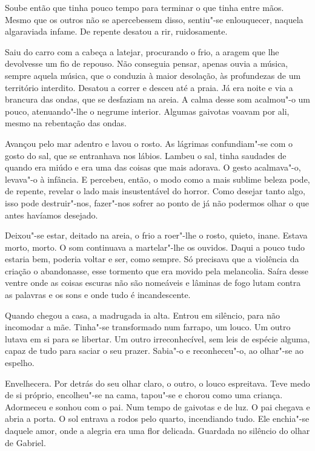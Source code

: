 Soube então que tinha pouco tempo para terminar o que tinha entre mãos.
Mesmo que os outros não se apercebessem disso, sentiu"-se enlouquecer,
naquela algaraviada infame. De repente desatou a rir, ruidosamente.

Saiu do carro com a cabeça a latejar, procurando o frio, a aragem que
lhe devolvesse um fio de repouso. Não conseguia pensar, apenas ouvia a
música, sempre aquela música, que o conduzia à maior desolação, às
profundezas de um território interdito. Desatou a correr e desceu até a
praia. Já era noite e via a brancura das ondas, que se desfaziam na
areia. A calma desse som acalmou"-o um pouco, atenuando"-lhe o negrume
interior. Algumas gaivotas voavam por ali, mesmo na rebentação das
ondas.

Avançou pelo mar adentro e lavou o rosto. As lágrimas confundiam"-se com
o gosto do sal, que se entranhava nos lábios. Lambeu o sal, tinha
saudades de quando era miúdo e era uma das coisas que mais adorava. O
gesto acalmava"-o, levava"-o à infância. E percebeu, então, o modo como a
mais sublime beleza pode, de repente, revelar o lado mais insustentável
do horror. Como desejar tanto algo, isso pode destruir"-nos, fazer"-nos
sofrer ao ponto de já não podermos olhar o que antes havíamos desejado.

Deixou"-se estar, deitado na areia, o frio a roer"-lhe o rosto, quieto,
inane. Estava morto, morto. O som continuava a martelar"-lhe os ouvidos.
Daqui a pouco tudo estaria bem, poderia voltar e ser, como sempre. Só
precisava que a violência da criação o abandonasse, esse tormento que
era movido pela melancolia. Saíra desse ventre onde as coisas escuras
não são nomeáveis e lâminas de fogo lutam contra as palavras e os sons e
onde tudo é incandescente.

Quando chegou a casa, a madrugada ia alta. Entrou em silêncio, para não
incomodar a mãe. Tinha"-se transformado num farrapo, um louco. Um outro
lutava em si para se libertar. Um outro irreconhecível, sem leis de
espécie alguma, capaz de tudo para saciar o seu prazer. Sabia"-o e
reconheceu"-o, ao olhar"-se ao espelho.

Envelhecera. Por detrás do seu olhar claro, o outro, o louco espreitava.
Teve medo de si próprio, encolheu"-se na cama, tapou"-se e chorou como uma
criança. Adormeceu e sonhou com o pai. Num tempo de gaivotas e de luz. O
pai chegava e abria a porta. O sol entrava a rodos pelo quarto,
incendiando tudo. Ele enchia"-se daquele amor, onde a alegria era uma
flor delicada. Guardada no silêncio do olhar de Gabriel.

